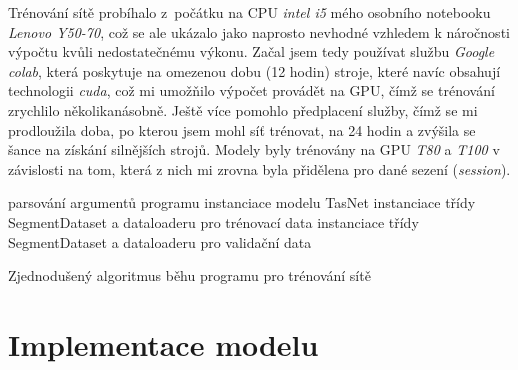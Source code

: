 Trénování sítě probíhalo z~počátku na CPU \textit{intel i5} mého osobního notebooku \textit{Lenovo Y50-70}, což se ale ukázalo jako naprosto nevhodné vzhledem k náročnosti výpočtu kvůli nedostatečnému výkonu. Začal jsem tedy používat službu \textit{Google colab}, která poskytuje na omezenou dobu (12 hodin) stroje, které navíc obsahují technologii \textit{cuda}, což mi umožňilo výpočet provádět na GPU, čímž se trénování zrychlilo několikanásobně. Ještě více pomohlo předplacení služby, čímž se mi prodloužila doba, po kterou jsem mohl síť trénovat, na 24 hodin a zvýšila se šance na získání silnějších strojů. Modely byly trénovány na GPU \textit{T80} a \textit{T100} v závislosti na tom, která z nich mi zrovna byla přidělena pro dané sezení (\textit{session}). 

\bigskip
{}
\begin{algorithm}[H]
 \LinesNumbered
 parsování argumentů programu\;
 instanciace modelu TasNet\;
 instanciace třídy SegmentDataset a dataloaderu pro trénovací data\;
 instanciace třídy SegmentDataset a dataloaderu pro validační data\;
 \caption{\label{alg:zakladnibeh}Zjednodušený algoritmus běhu programu pro trénování sítě}
\end{algorithm}


\section{Implementace modelu}


